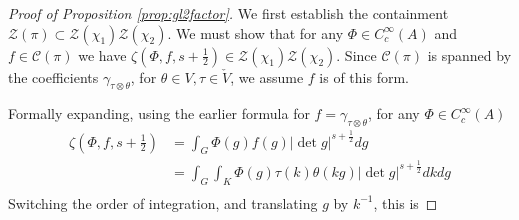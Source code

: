 \begin{proof}[Proof of Proposition \ref{prop:gl2factor}]
    We first establish the containment $\mathcal Z(\pi) \subset \mathcal Z(\chi_1)\mathcal Z(\chi_2)$. We must show that for any $\Phi \in C_c^\infty(A)$ and $f \in \mathcal C(\pi)$ we have $\zeta(\Phi,f,s+\frac{1}{2}) \in \mathcal Z(\chi_1)\mathcal Z(\chi_2)$. Since $\mathcal C(\pi)$ is spanned by the coefficients $\gamma_{\tau \otimes \theta}$, for $\theta \in V, \tau \in \check{V}$, we assume $f$ is of this form.

    Formally expanding, using the earlier formula for $f=\gamma_{\tau \otimes \theta}$, for any $\Phi \in C_c^\infty(A)$
    \begin{equation*}
        \begin{split}
            \zeta\left(\Phi,f,s+\frac{1}{2}\right) &= \int_G \Phi(g)f(g) |\det g|^{s+\frac{1}{2}} dg \\
            &= \int_G \int_K \Phi(g) \tau(k) \theta(kg)|\det g|^{s+\frac{1}{2}} dk dg \\
        \end{split}
    \end{equation*}
    Switching the order of integration, and translating $g$ by $k^{-1}$, this is 


\end{proof}
